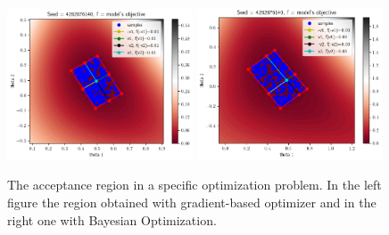 \documentclass[article]{jss}
\begin{document}
\begin{figure}[ht]
    \begin{center}
        \includegraphics[width=0.49\textwidth]{./latex_files/images/chapter4/ma2_region_1.png}
        \includegraphics[width=0.49\textwidth]{./latex_files/images/chapter4/ma2_region_1_bo.png}
    \end{center}
  \caption[The acceptance region of a specific deterministic simulator.]{The acceptance region in a specific optimization problem. In the left figure the region obtained with gradient-based optimizer and in the right one with Bayesian Optimization.}
  \label{fig:ma2_5}
\end{figure}
\end{document}
